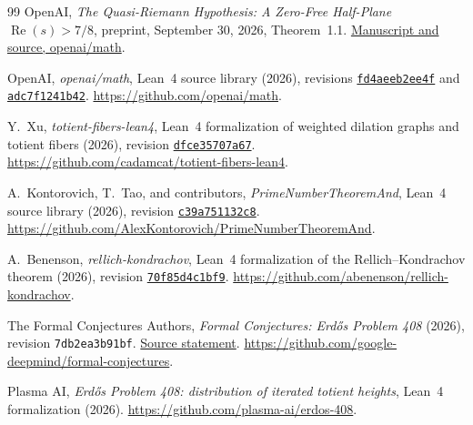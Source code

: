 \documentclass[10pt]{article}
\begin{document}
\begin{thebibliography}{99}
OpenAI, \emph{The Quasi-Riemann Hypothesis: A Zero-Free Half-Plane $\operatorname{Re}(s)>7/8$}, preprint, September 30, 2026, Theorem~1.1. \href{https://github.com/openai/math/blob/main/preprints/The-Quasi-Riemann-Hypothesis-September-30-2026/paper.pdf}{Manuscript and source, openai/math}.

OpenAI, \emph{openai/math}, Lean~4 source library (2026), revisions \href{https://github.com/openai/math/tree/fd4aeeb2ee4fc729c18d98444fed42fd0529eeeb/lean}{\texttt{fd4aeeb2ee4f}} and \href{https://github.com/openai/math/tree/adc7f1241b42e322a6451854ab7e4b4c146bf78a/lean}{\texttt{adc7f1241b42}}. \url{https://github.com/openai/math}.

Y.~Xu, \emph{totient-fibers-lean4}, Lean~4 formalization of weighted dilation graphs and totient fibers (2026), revision \href{https://github.com/cadamcat/totient-fibers-lean4/tree/dfce35707a67fce7362cb2bd95af8b80a0b0373e}{\texttt{dfce35707a67}}. \url{https://github.com/cadamcat/totient-fibers-lean4}.

A.~Kontorovich, T.~Tao, and contributors, \emph{PrimeNumberTheoremAnd}, Lean~4 source library (2026), revision \href{https://github.com/AlexKontorovich/PrimeNumberTheoremAnd/tree/c39a751132c88b6e8080b74c74023fd95b3d8be0}{\texttt{c39a751132c8}}. \url{https://github.com/AlexKontorovich/PrimeNumberTheoremAnd}.

A.~Benenson, \emph{rellich-kondrachov}, Lean~4 formalization of the Rellich--Kondrachov theorem (2026), revision \href{https://github.com/abenenson/rellich-kondrachov/tree/70f85d4c1bf99c6e7d61e8be4daa6f3664d08d23}{\texttt{70f85d4c1bf9}}. \url{https://github.com/abenenson/rellich-kondrachov}.

The Formal Conjectures Authors, \emph{Formal Conjectures: Erd\H{o}s Problem 408} (2026), revision \texttt{7db2ea3b91bf}. \href{https://github.com/google-deepmind/formal-conjectures/blob/7db2ea3b91bfbd0ab620215163e6c488bbb916d5/FormalConjectures/ErdosProblems/408.lean}{Source statement}. \url{https://github.com/google-deepmind/formal-conjectures}.

Plasma AI, \emph{Erd\H{o}s Problem 408: distribution of iterated totient heights}, Lean~4 formalization (2026). \url{https://github.com/plasma-ai/erdos-408}.

\end{thebibliography}
\end{document}
